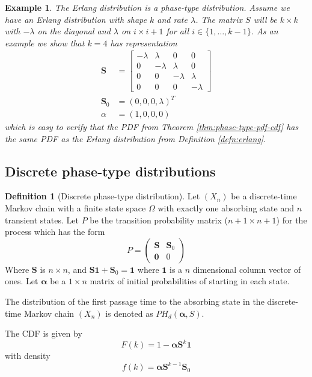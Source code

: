 \documentclass{article}
\theoremstyle{plain}
\newtheorem{example}{Example}[theorem]
\theoremstyle{definition}
\newtheorem{defn}[theorem]{Definition}
\theoremstyle{remark}
\numberwithin{equation}{section}
\begin{document}
\begin{example}
The Erlang distribution is a phase-type distribution.
Assume we have an Erlang distribution with shape $k$ and rate $\lambda$.
The matrix $S$ will be $k \times k$ with $-\lambda$ on the diagonal and $\lambda$ on $i \times i + 1$ for all $i \in \{1, \ldots, k - 1\}$.
As an example we show that $k = 4$ has representation
\begin{align*}
    \mathbf S &= \begin{bmatrix}
        -\lambda & \lambda & 0 & 0\\
        0 & - \lambda & \lambda & 0\\
        0 & 0 & -\lambda & \lambda\\
        0 & 0 & 0 & -\lambda
        \end{bmatrix}\\
    \mathbf{S}_0 &= (0, 0, 0, \lambda)^T\\
    \alpha &= (1,0,0,0)
\end{align*}
which is easy to verify that the PDF from Theorem \ref{thm:phase-type-pdf-cdf} has the same PDF as the Erlang distribution from Definition \ref{defn:erlang}.
\end{example}

\subsection{Discrete phase-type distributions}
\begin{defn}[Discrete phase-type distribution]
\cite{neuts1981}
Let $(X_n)$ be a discrete-time Markov chain with a finite state space $\Omega$ with exactly one absorbing state and $n$ transient states.
Let $P$ be the transition probability matrix ($n + 1 \times n + 1$) for the process which has the form
$$
P = \begin{pmatrix}
\mathbf{S} & \mathbf{S}_0\\
\mathbf{0} & 0
\end{pmatrix}
$$
Where $\mathbf{S}$ is $n \times n$, and $\mathbf{S} \mathbf{1}  + \mathbf{S}_0 = \mathbf{1}$ where $\mathbf{1}$ is a $n$ dimensional column vector of ones.
Let $\boldsymbol{\alpha}$ be a $1 \times n$ matrix of initial probabilities of starting in each state.

The distribution of the first passage time to the absorbing state in the discrete-time Markov chain $(X_n)$ is denoted as $PH_d(\boldsymbol{\alpha}, S)$.

The CDF is given by
$$
F(k) = 1 - \boldsymbol{\alpha} \mathbf{S}^k \mathbf{1}
$$
with density
$$
f(k) = \boldsymbol{\alpha} \mathbf{S}^{k - 1} \mathbf{S}_0
$$
\end{defn}
\end{document}
